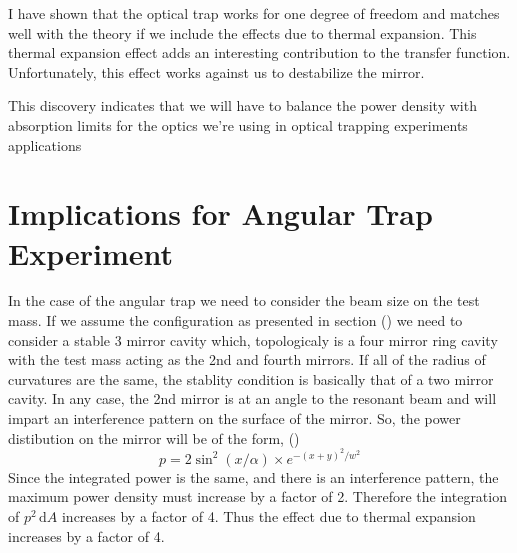 \acresetall

I have shown that the optical trap works for one degree of freedom and
matches well with the theory if we include the effects due to thermal
expansion.
This thermal expansion effect adds an interesting contribution to the transfer
function. Unfortunately, this effect works against us to destabilize the mirror.

This discovery indicates that we will have to balance the power density with
absorption limits for the optics we're using in optical trapping experiments
applications

\section{Implications for Angular Trap Experiment}
In the case of the angular trap we need to consider the beam size on the
test mass.
If we assume the configuration as presented in section () we
need to consider a stable 3 mirror cavity which, topologicaly is a four
mirror ring cavity with the test mass acting as the 2nd and fourth mirrors.
If all of the radius of curvatures are the same, the stablity condition is
basically that of a two mirror cavity.
In any case, the 2nd mirror is at an angle to the resonant beam and will
impart an interference pattern on the surface of the mirror.
So, the power distibution on the mirror will be of the form,
()
\begin{equation}
p = 2 \sin^2(x/\alpha) \times e^{-(x+y)^2/w^2 }
\end{equation}
Since the integrated power is the same, and there is an interference pattern,
the maximum power density must increase by a factor of 2.
Therefore the integration of $p^2 \, \mathrm{d}A$ increases by a factor of 4.
Thus the effect due to thermal expansion increases by a factor of 4.


